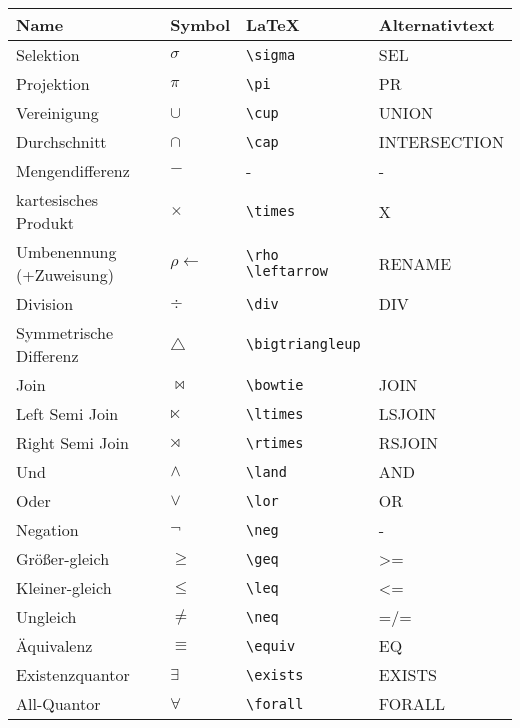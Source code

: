 \documentclass{lehramt-informatik}
\begin{document}
\begin{tabular}{l|l|l|l}
\textbf{Name} & \textbf{Symbol} & \textbf{LaTeX} & \textbf{Alternativtext}\\\hline\hline
Selektion & $\sigma$ & \verb|\sigma| & SEL\\
Projektion & $\pi$ & \verb|\pi| & PR\\
Vereinigung & $\cup$ & \verb|\cup| & UNION\\
Durchschnitt & $\cap$ & \verb|\cap| & INTERSECTION\\
Mengendifferenz & $-$ & - & -\\
kartesisches Produkt & $\times$ & \verb|\times| & X\\
Umbenennung (+Zuweisung) & $\rho \leftarrow$ & \verb|\rho \leftarrow| & RENAME\\
Division & $\div$ & \verb|\div| & DIV\\

Symmetrische Differenz & $\bigtriangleup$ & \verb|\bigtriangleup| & \\

\hline

Join & $\bowtie$ & \verb|\bowtie| & JOIN\\




Left Semi Join & $\ltimes$ & \verb|\ltimes| & LSJOIN\\

Right Semi Join & $\rtimes$ & \verb|\rtimes| & RSJOIN\\

\hline

Und & $\land$ & \verb|\land| & AND\\

Oder & $\lor$ & \verb|\lor| & OR\\

Negation & $\neg$ & \verb|\neg| & -\\

Größer-gleich & $\geq$ & \verb|\geq| & >=\\

Kleiner-gleich & $\leq$ & \verb|\leq| & <=\\

Ungleich & $\neq$ & \verb|\neq| & =/=\\

Äquivalenz & $\equiv$ & \verb|\equiv| & EQ\\

Existenzquantor & $\exists$ & \verb|\exists| & EXISTS\\

All-Quantor & $\forall$ & \verb|\forall| & FORALL\\
\end{tabular}
\end{document}
